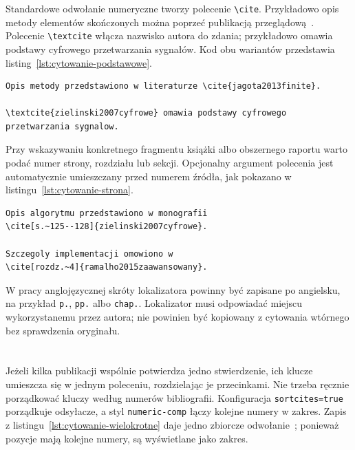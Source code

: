 Standardowe odwołanie numeryczne tworzy polecenie \verb|\cite|. Przykładowo opis metody elementów skończonych można poprzeć publikacją przeglądową~\cite{jagota2013finite}. Polecenie \verb|\textcite| włącza nazwisko autora do zdania; przykładowo \textcite{zielinski2007cyfrowe} omawia podstawy cyfrowego przetwarzania sygnałów. Kod obu wariantów przedstawia listing~\ref{lst:cytowanie-podstawowe}.

\begin{lstlisting}[style=thesis,caption={Pojedyncze cytowanie i cytowanie włączone do zdania},label={lst:cytowanie-podstawowe}]
Opis metody przedstawiono w literaturze \cite{jagota2013finite}.

\textcite{zielinski2007cyfrowe} omawia podstawy cyfrowego
przetwarzania sygnalow.
\end{lstlisting}

Przy wskazywaniu konkretnego fragmentu książki albo obszernego raportu warto podać numer strony, rozdziału lub sekcji. Opcjonalny argument polecenia jest automatycznie umieszczany przed numerem źródła, jak pokazano w listingu~\ref{lst:cytowanie-strona}.

\begin{lstlisting}[style=thesis,caption={Cytowanie ze wskazaniem strony lub rozdziału},label={lst:cytowanie-strona}]
Opis algorytmu przedstawiono w monografii
\cite[s.~125--128]{zielinski2007cyfrowe}.

Szczegoly implementacji omowiono w
\cite[rozdz.~4]{ramalho2015zaawansowany}.
\end{lstlisting}

W pracy anglojęzycznej skróty lokalizatora powinny być zapisane po angielsku, na przykład \verb|p.|, \verb|pp.| albo \verb|chap.|. Lokalizator musi odpowiadać miejscu wykorzystanemu przez autora; nie powinien być kopiowany z cytowania wtórnego bez sprawdzenia oryginału.

\section{}

Jeżeli kilka publikacji wspólnie potwierdza jedno stwierdzenie, ich klucze umieszcza się w jednym poleceniu, rozdzielając je przecinkami. Nie trzeba ręcznie porządkować kluczy według numerów bibliografii. Konfiguracja \texttt{sortcites=true} porządkuje odsyłacze, a styl \texttt{numeric-comp} łączy kolejne numery w zakres. Zapis z listingu~\ref{lst:cytowanie-wielokrotne} daje jedno zbiorcze odwołanie~\cite{knuth1984,lamport1994,mittelbach2004}; ponieważ pozycje mają kolejne numery, są wyświetlane jako zakres.

